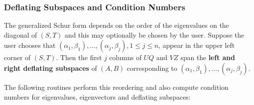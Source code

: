 \subsubsection{Deflating Subspaces and Condition Numbers}

The generalized Schur 
form depends on the order of the eigenvalues on the
diagonal of $(S,T)$ and this may optionally be chosen by the user.  Suppose
the user chooses that $(\alpha_1,\beta_1),\ldots,(\alpha_j,\beta_j),
1 \leq j \leq n$, appear in the upper left corner of $(S,T)$.  Then the
first $j$ columns of $UQ$ and $VZ$ span the {\bf left and right deflating
subspaces}  
of $(A,B)$ corresponding to $(\alpha_1,\beta_1),\ldots, (\alpha_j,\beta_j)$.

The following routines perform this reordering
and also compute condition
numbers for eigenvalues, eigenvectors and deflating subspaces:

